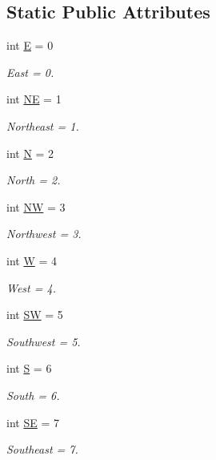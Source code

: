 \subsection*{Static Public Attributes}
\begin{DoxyCompactItemize}
\item 
int \mbox{\hyperlink{classpath_plan_1_1dir_ace7274c1b8112b1e26f8ad53e611cb55}{E}} = 0
\begin{DoxyCompactList}\small\item\em East = 0. \end{DoxyCompactList}\item 
int \mbox{\hyperlink{classpath_plan_1_1dir_a577daab51fe30a40ad5cff407197018d}{NE}} = 1
\begin{DoxyCompactList}\small\item\em Northeast = 1. \end{DoxyCompactList}\item 
int \mbox{\hyperlink{classpath_plan_1_1dir_a86f4448228a961438a153a2420fec66b}{N}} = 2
\begin{DoxyCompactList}\small\item\em North = 2. \end{DoxyCompactList}\item 
int \mbox{\hyperlink{classpath_plan_1_1dir_a258cdd8e6d1f4cdcbe6285c13ba1390a}{NW}} = 3
\begin{DoxyCompactList}\small\item\em Northwest = 3. \end{DoxyCompactList}\item 
int \mbox{\hyperlink{classpath_plan_1_1dir_a73cd667b05ff0a4836e3c07ce8f458ce}{W}} = 4
\begin{DoxyCompactList}\small\item\em West = 4. \end{DoxyCompactList}\item 
int \mbox{\hyperlink{classpath_plan_1_1dir_a27d5dbc908c392e61e749c8090cbfb75}{SW}} = 5
\begin{DoxyCompactList}\small\item\em Southwest = 5. \end{DoxyCompactList}\item 
int \mbox{\hyperlink{classpath_plan_1_1dir_adf55896c906c0e87d7f341d893258236}{S}} = 6
\begin{DoxyCompactList}\small\item\em South = 6. \end{DoxyCompactList}\item 
int \mbox{\hyperlink{classpath_plan_1_1dir_a748bd4e686a7a6401bb9ed1a65962244}{SE}} = 7
\begin{DoxyCompactList}\small\item\em Southeast = 7. \end{DoxyCompactList}\end{DoxyCompactItemize}


